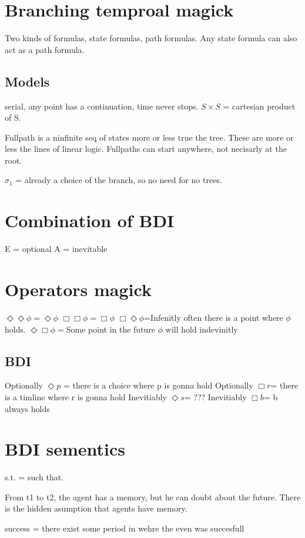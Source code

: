 \documentclass{article}
\begin{document}
\section{Branching temproal magick}

Two kinds of formulas, state formulas, path formulas.
Any state formula can also act as a path formula.

\subsection{Models}
serial, any point has a continuation, time never stops.
$S \times S$ = cartesian product of S.

Fullpath is a ninfinite seq of states more or less true the tree.
These are more or less the lines of linear logic.
Fullpaths can start anywhere, not necisarly at the root.

$\sigma_1$ = already a choice of the branch, so no need for no trees.

\section{Combination of BDI}
E = optional
A = inevitable

\section{Operators magick}
$\Diamond\Diamond\phi=\Diamond\phi$
$\Box\Box\phi=\Box\phi$
$\Box\Diamond\phi$=Infenitly often there is a point where $\phi$ holds.
$\Diamond\Box\phi=$Some point in the future $\phi$ will hold indevinitly

\subsection{BDI}
Optionally $\Diamond p$ = there is a choice where p is gonna hold
Optionally $\Box r$= there is a timline where r is gonna hold
Inevitiably $\Diamond s$=  ???
Inevitiably $\Box b$=  b always holds

\section{BDI sementics}
s.t. = such that.

From t1 to t2, the agent has a memory, but he can doubt about the future.
There is the hidden asumption that agents have memory.

success = there exist some period in wehre the even was succesfull
\end{document}
